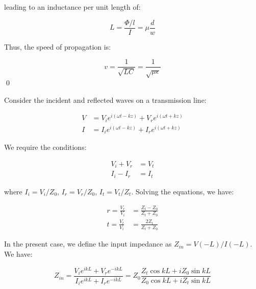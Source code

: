 \documentclass[12pt]{article}
\begin{document}
leading to an inductance per unit length of:

\begin{equation}
    L = \frac{\Phi/l}{I} = \mu \frac{d}{w}
\end{equation}

Thus, the speed of propagation is:

\begin{equation}
    v = \frac{1}{\sqrt{LC}} = \frac{1}{\sqrt{\mu\epsilon}}
\end{equation}
\qed


Consider the incident and reflected waves on a transmission line:

\begin{equation}
\begin{split}
    V &= V_{i} e^{i(\omega t - kz)} + V_{r} e^{i(\omega t + kz)} \\
    I &= I_{i} e^{i(\omega t - kz)} + I_{r} e^{i(\omega t + kz)}
\end{split}
\end{equation}

We require the conditions:

\begin{equation}
\begin{split}
    V_{i} + V_{r} &= V_{t} \\
    I_{i} - I_{r} &= I_{t}
\end{split}
\end{equation}

where $I_{i} = V_{i}/Z_{0}$, $I_{r} = V_{r}/Z_{0}$, $I_{t} = V_{t}/Z_{t}$. Solving the equations, we have:

\begin{equation}
\begin{split}
    r = \frac{V_{r}}{V_{i}} &= \frac{Z_{t} - Z_{0}}{Z_{t} + Z_{0}} \\
    t = \frac{V_{t}}{V_{i}} &= \frac{2Z_{t}}{Z_{t} + Z_{0}}
\end{split}
\end{equation}

In the present case, we define the input impedance as $Z_{in} = V(-L)/I(-L)$. We have:

\begin{equation}
    Z_{in} = \frac{V_{i} e^{ikL} + V_{r} e^{-ikL}}{I_{i} e^{ikL} + I_{r} e^{-ikL}} = Z_{0} \frac{Z_{t} \cos{kL} + iZ_{0} \sin{kL}}{Z_{0} \cos{kL} + iZ_{t} \sin{kL}}
\end{equation}
\end{document}
